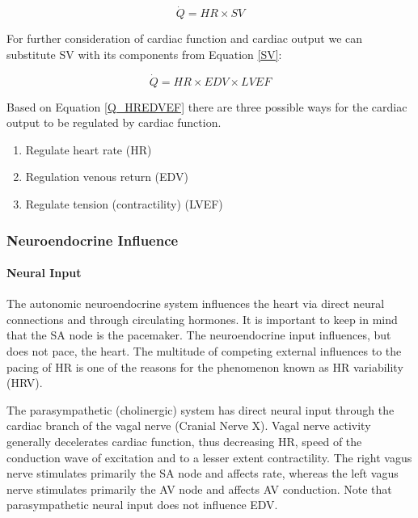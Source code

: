 \begin{equation}
    \dot{Q} = HR \times SV
    \label{Q_HRSV}
\end{equation}

For further consideration of cardiac function and cardiac output we can substitute SV with its components from Equation \ref{SV}:

\begin{equation}
    \dot{Q} = HR \times EDV \times LVEF
    \label{Q_HREDVEF}
\end{equation}


Based on Equation \ref{Q_HREDVEF} there are three possible ways for the cardiac output to be regulated by cardiac function.

\begin{enumerate}
    \item Regulate heart rate (HR)
    \item Regulation venous return (EDV)
    \item Regulate tension (contractility) (LVEF) 
\end{enumerate}

\subsubsection{Neuroendocrine Influence}

\paragraph{Neural Input}

The autonomic neuroendocrine system influences the heart via direct neural connections and through circulating hormones. It is important to keep in mind that the SA node is the pacemaker. The neuroendocrine input influences, but does not pace, the heart. The multitude of competing external influences to the pacing of HR is one of the reasons for the phenomenon known as HR variability (HRV). 

The parasympathetic (cholinergic) system has direct neural input through the cardiac branch of the vagal nerve (Cranial Nerve X). Vagal nerve activity generally decelerates cardiac function, thus decreasing HR, speed of the conduction wave of excitation and to a lesser extent contractility. The right vagus nerve stimulates primarily the SA node and affects rate, whereas the left vagus nerve stimulates primarily the AV node and affects AV conduction. Note that parasympathetic neural input does not influence EDV. 

